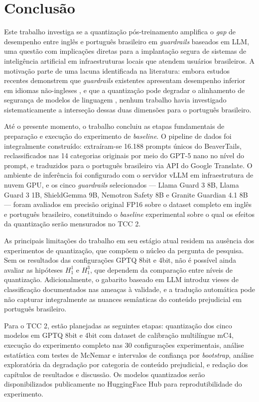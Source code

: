 \chapter{Conclusão}
\label{cap:conclusao}

Este trabalho investiga se a quantização pós-treinamento amplifica o \textit{gap} de desempenho entre inglês e português brasileiro em \textit{guardrails} baseados em LLM, uma questão com implicações diretas para a implantação segura de sistemas de inteligência artificial em infraestruturas locais que atendem usuários brasileiros. A motivação parte de uma lacuna identificada na literatura: embora estudos recentes demonstrem que \textit{guardrails} existentes apresentam desempenho inferior em idiomas não-ingleses \cite{yang2024benchmarking}, e que a quantização pode degradar o alinhamento de segurança de modelos de linguagem \cite{jaesik2025}, nenhum trabalho havia investigado sistematicamente a interseção dessas duas dimensões para o português brasileiro.

Até o presente momento, o trabalho concluiu as etapas fundamentais de preparação e execução do experimento de \textit{baseline}. O pipeline de dados foi integralmente construído: extraíram-se 16.188 prompts únicos do BeaverTails, reclassificados nas 14 categorias originais por meio do GPT-5 nano no nível do prompt, e traduzidos para o português brasileiro via API do Google Translate. O ambiente de inferência foi configurado com o servidor vLLM em infraestrutura de nuvem GPU, e os cinco \textit{guardrails} selecionados — Llama Guard 3 8B, Llama Guard 3 1B, ShieldGemma 9B, Nemotron Safety 8B e Granite Guardian 4.1 8B — foram avaliados em precisão original FP16 sobre o dataset completo em inglês e português brasileiro, constituindo o \textit{baseline} experimental sobre o qual os efeitos da quantização serão mensurados no TCC 2.

As principais limitações do trabalho em seu estágio atual residem na ausência dos experimentos de quantização, que compõem o núcleo da pergunta de pesquisa. Sem os resultados das configurações GPTQ 8bit e 4bit, não é possível ainda avaliar as hipóteses $H_1^1$ e $H_1^3$, que dependem da comparação entre níveis de quantização. Adicionalmente, o gabarito baseado em LLM introduz vieses de classificação documentados nas ameaças à validade, e a tradução automática pode não capturar integralmente as nuances semânticas do conteúdo prejudicial em português brasileiro.

Para o TCC 2, estão planejadas as seguintes etapas: quantização dos cinco modelos em GPTQ 8bit e 4bit com dataset de calibração multilíngue mC4, execução do experimento completo nas 30 configurações experimentais, análise estatística com testes de McNemar e intervalos de confiança por \textit{bootstrap}, análise exploratória da degradação por categoria de conteúdo prejudicial, e redação dos capítulos de resultados e discussão. Os modelos quantizados serão disponibilizados publicamente no HuggingFace Hub para reprodutibilidade do experimento.




